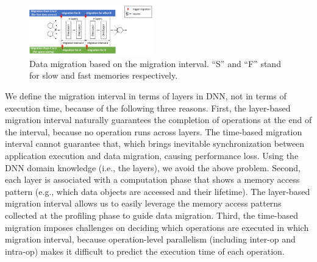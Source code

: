 \begin{figure}
\centering
\includegraphics[width=0.48\textwidth]{figures/migration_interval.pdf}
\vspace{-20pt}
\caption{
\textcolor{check}{
Data migration based on the migration interval.  
\textcolor{check}{``S'' and ``F'' stand for slow and fast memories respectively.}}
}
	\centering
	\vspace{-15pt}
	\label{fig:migration_interval} 
\end{figure}

We define the migration interval in terms of layers in DNN, not in terms of execution time, because of the following three reasons. First, the layer-based migration interval naturally guarantees the completion of operations at the end of the interval, because no operation runs across layers. 
The time-based migration interval cannot guarantee that, which brings inevitable synchronization between application execution and data migration, causing performance loss. Using the DNN domain knowledge (i.e., the layers), we avoid the above problem. Second, each layer is associated with a computation phase that shows a memory access pattern \textcolor{check}{(e.g., which data objects are  accessed and their lifetime)}. 
The layer-based migration interval allows us to easily leverage the memory access patterns collected at the profiling phase to guide data migration. Third, the time-based migration imposes challenges on deciding which operations are executed in which migration interval, because \textcolor{check}{operation-level parallelism  (including inter-op and intra-op)} \textcolor{check}{makes it difficult to predict the execution time of each operation}.


